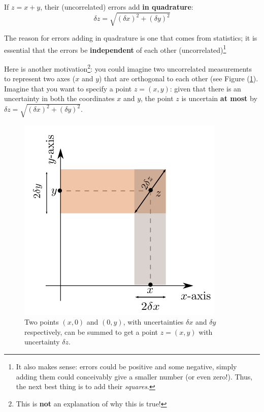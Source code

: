 \begin{imp}
If $z = x + y$, their (uncorrelated) errors add \textbf{in quadrature}:
\begin{equation}
    \delta z = \sqrt{\left(\delta x\right)^2+\left(\delta y\right)^2}
    \label{quadrature}
\end{equation}
\end{imp}

The reason for errors adding in quadrature is one that comes from statistics; it is essential that the errors be \textbf{independent} of each other (uncorrelated)\footnote{It also makes sense:  errors could be positive and some negative, simply adding them could conceivably give a smaller number (or even zero!). Thus, the next best thing is to add their \textit{squares}. }

Here is another motivation\footnote{This is \textbf{not} an explanation of why this is true!}: you could imagine two uncorrelated measurements to represent two axes ($x$ and $y$) that are orthogonal to each other (see Figure (\ref{fig:quadrature}). Imagine that you want to specify a point $z = (x,y)$: given that there is an uncertainty in both the coordinates $x$ and $y$, the point $z$ is uncertain \textbf{at most} by $\delta z = \sqrt{\left(\delta x\right)^2+\left(\delta y\right)^2}$.

\begin{figure}
    \centering
    \includegraphics[scale=0.5]{figs/quadrature.png}
    \caption{Two points $(x,0)$ and $(0,y)$, with uncertainties $\delta x$ and $\delta y$ respectively, can be summed to get a point $z=(x,y)$ with uncertainty $\delta z$. }
    \label{fig:quadrature}
\end{figure}

